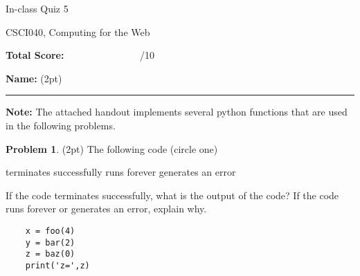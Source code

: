 \documentclass[10pt]{article}
\theoremstyle{definition}
\newtheorem{problem}{Problem}
\begin{document}
\begin{center}
    {
\Large
In-class Quiz 5
}

    \vspace{0.1in}
CSCI040, Computing for the Web

    \vspace{0.1in}
\end{center}

\vspace{0.25in}
\noindent
\textbf{Total Score:} ~~~~~~~~~~~~~~~/10

\vspace{0.5in}
\noindent
\textbf{Name:} (2pt)

\noindent
\rule{\textwidth}{0.1pt}
\vspace{0.15in}

\noindent 
\textbf{Note:} The attached handout implements several python functions that are used in the following problems.

\begin{problem}
    (2pt)
    The following code (circle one)
    
    \vspace{0.25in}
    \hspace{0.5in}terminates successfully
    \hspace{1in}runs forever
    \hspace{1in}generates an error
    \vspace{0.25in}

    \noindent
    If the code terminates successfully, what is the output of the code?
    If the code runs forever or generates an error, explain why.
\end{problem}
\begin{lstlisting}
    x = foo(4)
    y = bar(2)
    z = baz(0)
    print('z=',z)
\end{lstlisting}
\vspace{1.5in}
\end{document}
